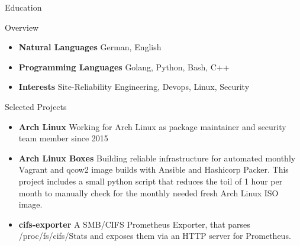 \documentclass[]{mcdowellcv}
\begin{document}
\begin{cvsection}{Education}
\begin{cvsection}{Overview}
\begin{cvsubsection}{}{}{}
\begin{itemize}
\item \textbf{Natural Languages} German, English
\item \textbf{Programming Languages} Golang, Python, Bash, C++
\item \textbf{Interests} Site-Reliability Engineering, Devops, Linux, Security
\end{itemize}
\end{cvsubsection}
\end{cvsection}

\end{cvsection}
\begin{cvsection}{Selected Projects}
\begin{cvsubsection}{}{}{}
\begin{itemize}
	\item \textbf{Arch Linux} Working for Arch Linux as package maintainer and security team member since 2015
	\item \textbf{Arch Linux Boxes} Building reliable infrastructure for automated monthly Vagrant and qcow2 image builds with Ansible and Hashicorp Packer. This project includes a small python script that reduces the toil of 1 hour per month to manually check for the monthly needed fresh Arch Linux ISO image.
	\item \textbf{cifs-exporter} A SMB/CIFS Prometheus Exporter, that parses /proc/fs/cifs/Stats and exposes them via an HTTP
server for Prometheus.
\end{itemize}
\end{cvsubsection}
\end{cvsection}
\end{document}
